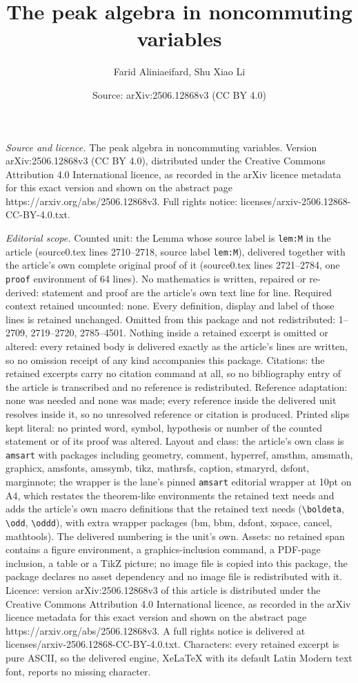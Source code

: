 \documentclass[10pt,a4paper]{amsart}
\title[The peak algebra in noncommuting variables]{The peak algebra in noncommuting variables}
\author{Farid Aliniaeifard, Shu Xiao Li}
\date{Source: arXiv:2506.12868v3 (CC BY 4.0)}
\begin{document}
\maketitle

\noindent\emph{Source and licence.} The peak algebra in noncommuting variables. Version arXiv:2506.12868v3 (CC BY 4.0), distributed under the Creative Commons Attribution 4.0 International licence, as recorded in the arXiv licence metadata for this exact version and shown on the abstract page https://arxiv.org/abs/2506.12868v3. Full rights notice: licenses/arxiv-2506.12868-CC-BY-4.0.txt.\par\smallskip

\noindent\textit{Editorial scope.} Counted unit: the Lemma whose source label is \texttt{lem:M} in the article (source0.tex lines 2710--2718, source label \texttt{lem:M}), delivered together with the article's own complete original proof of it (source0.tex lines 2721--2784, one \texttt{proof} environment of 64 lines). No mathematics is written, repaired or re-derived: statement and proof are the article's own text line for line. Required context retained uncounted: none. Every definition, display and label of those lines is retained unchanged. Omitted from this package and not redistributed: 1--2709, 2719--2720, 2785--4501. Nothing inside a retained excerpt is omitted or altered: every retained body is delivered exactly as the article's lines are written, so no omission receipt of any kind accompanies this package. Citations: the retained excerpts carry no citation command at all, so no bibliography entry of the article is transcribed and no reference is redistributed. Reference adaptation: none was needed and none was made; every reference inside the delivered unit resolves inside it, so no unresolved reference or citation is produced. Printed slips kept literal: no printed word, symbol, hypothesis or number of the counted statement or of its proof was altered. Layout and class: the article's own class is \texttt{amsart} with packages including geometry, comment, hyperref, amsthm, amsmath, graphicx, amsfonts, amssymb, tikz, mathrsfs, caption, stmaryrd, dsfont, marginnote; the wrapper is the lane's pinned \texttt{amsart} editorial wrapper at 10pt on A4, which restates the theorem-like environments the retained text needs and adds the article's own macro definitions that the retained text needs (\texttt{\textbackslash boldeta}, \texttt{\textbackslash odd}, \texttt{\textbackslash oddd}), with extra wrapper packages (bm, bbm, dsfont, xspace, cancel, mathtools). The delivered numbering is the unit's own. Assets: no retained span contains a figure environment, a graphics-inclusion command, a PDF-page inclusion, a table or a TikZ picture; no image file is copied into this package, the package declares no asset dependency and no image file is redistributed with it. Licence: version arXiv:2506.12868v3 of this article is distributed under the Creative Commons Attribution 4.0 International licence, as recorded in the arXiv licence metadata for this exact version and shown on the abstract page https://arxiv.org/abs/2506.12868v3. A full rights notice is delivered at licenses/arxiv-2506.12868-CC-BY-4.0.txt. Characters: every retained excerpt is pure ASCII, so the delivered engine, XeLaTeX with its default Latin Modern text font, reports no missing character.
\end{document}

